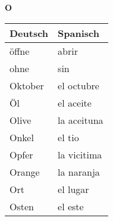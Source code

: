\begin{flushright}\begin{Huge}\textbf{O}\end{Huge}\end{flushright}

\begin{longtable}{p{} p{}} 
\textbf{Deutsch}     & \textbf{Spanisch}                                       \\ \hline
\hline
\endhead %
öffne & abrir \\
ohne & sin \\
Oktober & el octubre\\
Öl & el aceite\\
Olive & la aceituna\\
Onkel & el tio \\
Opfer & la vicitima\\
Orange & la naranja \\
Ort & el lugar \\
Osten & el este \\

\end{longtable}
